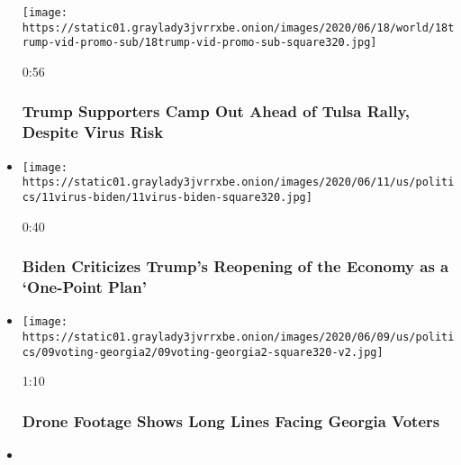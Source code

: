 \begin{itemize}
  \texttt{[image: https://static01.graylady3jvrrxbe.onion/images/2020/06/18/world/18trump-vid-promo-sub/18trump-vid-promo-sub-square320.jpg]}

  0:56

  \hypertarget{trump-supporters-camp-out-ahead-of-tulsa-rally-despite-virus-risk}{%
  \subsubsection{Trump Supporters Camp Out Ahead of Tulsa Rally, Despite
  Virus
  Risk}\label{trump-supporters-camp-out-ahead-of-tulsa-rally-despite-virus-risk}}
\item
  \href{https://www.nytimes3xbfgragh.onion/video/us/100000007186817/biden-criticizes-trumps-reopening-of-the-economy-as-a-one-point-plan.html?action=click\&module=video-series-bar\&region=header\&pgtype=Article\&playlistId=video/2020-Elections}{}

  \texttt{[image: https://static01.graylady3jvrrxbe.onion/images/2020/06/11/us/politics/11virus-biden/11virus-biden-square320.jpg]}

  0:40

  \hypertarget{biden-criticizes-trumps-reopening-of-the-economy-as-a-one-point-plan}{%
  \subsubsection{Biden Criticizes Trump's Reopening of the Economy as a
  `One-Point
  Plan'}\label{biden-criticizes-trumps-reopening-of-the-economy-as-a-one-point-plan}}
\item
  \href{https://www.nytimes3xbfgragh.onion/video/us/100000007182268/georgia-election-day-atlanta.html?action=click\&module=video-series-bar\&region=header\&pgtype=Article\&playlistId=video/2020-Elections}{}

  \texttt{[image: https://static01.graylady3jvrrxbe.onion/images/2020/06/09/us/politics/09voting-georgia2/09voting-georgia2-square320-v2.jpg]}

  1:10

  \hypertarget{drone-footage-shows-long-lines-facing-georgia-voters}{%
  \subsubsection{Drone Footage Shows Long Lines Facing Georgia
  Voters}\label{drone-footage-shows-long-lines-facing-georgia-voters}}
\item
  \href{https://www.nytimes3xbfgragh.onion/video/us/100000007177074/biden-trump-economy-george-floyd.html?action=click\&module=video-series-bar\&region=header\&pgtype=Article\&playlistId=video/2020-Elections}{}


\end{itemize}
